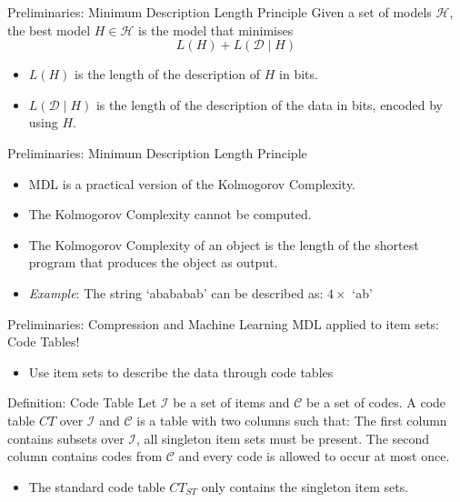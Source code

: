 \documentclass{beamer}
\newcommand{\codeset}{\mathcal{C}}
\newcommand{\codetable}{CT}
\newcommand{\dataset}{\mathcal{D}}
\newcommand{\itemset}{\mathcal{I}}
\newcommand{\model}{H}
\newcommand{\modelset}{\mathcal{H}}
\begin{document}
\begin{frame}{Preliminaries: Minimum Description Length Principle}
Given a set of models $\modelset$, the best model $\model \in \modelset$ is the model that minimises \[L(H) + L(\dataset \mid \model)\]
\begin{itemize}
	\item $L(\model)$ is the length of the description of $\model$ in bits.
	\item $L(\dataset\mid\model)$ is the length of the description of the data in bits, encoded by using $\model$.
\end{itemize}
\end{frame}

\begin{frame}{Preliminaries: Minimum Description Length Principle}
\begin{itemize}
	\item MDL is a practical version of the Kolmogorov Complexity.
	\item The Kolmogorov Complexity cannot be computed. 
	\item The Kolmogorov Complexity of an object is the length of the shortest program that produces the object as output. 
	\item \textit{Example}: The string `abababab' can be described as: $4 \times$ `ab'
\end{itemize}
\end{frame}


\begin{frame}{Preliminaries: Compression and Machine Learning}
MDL applied to item sets: Code Tables!
\begin{itemize}
	\item Use item sets to describe the data through code tables
\end{itemize}

\begin{block}{Definition: Code Table}
Let $\itemset$ be a set of items and $\codeset$ be a set of codes. A code table $\codetable$ over $\itemset$ and $\codeset$ is a table with two columns such that: The first column contains subsets over $\itemset$, all singleton item sets must be present. The second column contains codes from $\codeset$ and every code is allowed to occur at most once.
\end{block}

\begin{itemize}
	\item The standard code table $\codetable_{ST}$ only contains the singleton item sets.
\end{itemize}
\end{frame}
\end{document}
